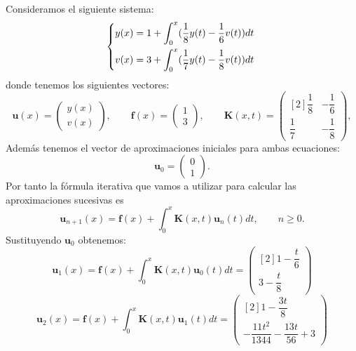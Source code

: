 \begin{ejemplo}
	Consideramos el siguiente sistema:
	\[ \begin{dcases}
		y(x) = 1 + \displaystyle \int_0^x (\dfrac{1}{8}y(t)-\dfrac{1}{6}v(t))dt \\
		v(x) = 3+ \displaystyle \int_0^x (\dfrac{1}{7}y(t)-\dfrac{1}{8}v(t))dt \;
	\end{dcases} \]%
	donde tenemos los siguientes vectores:
	\begin{equation}
		\textbf{u}(x) = \begin{pmatrix}	y(x) \\ v(x)	\end{pmatrix}, \qquad \textbf{f}(x) = \begin{pmatrix}	1 \\ 3	\end{pmatrix}, \qquad \textbf{K}(x,t) = \begin{pmatrix}[2]	\dfrac{1}{8} & -\dfrac{1}{6} \\ \dfrac{ 1}{7} & -\dfrac{1}{8}	\end{pmatrix},
	\end{equation}
	Además tenemos el vector de aproximaciones iniciales para ambas ecuaciones:
	\begin{equation}
		\textbf{u}_0 = \begin{pmatrix}	0 \\ 1	\end{pmatrix}.
	\end{equation}
	Por tanto la fórmula iterativa que vamos a utilizar para calcular las aproximaciones sucesivas es
	\begin{equation}
		\textbf{u}_{n+1}(x) = \textbf{f}(x) + \int_0^x \textbf{K}(x,t)\textbf{u}_n(t)dt, \qquad n \geqslant 0.
	\end{equation}
	Sustituyendo $\textbf{u}_0$ obtenemos:
	\begin{equation}
		\textbf{u}_{1}(x) = \textbf{f}(x) + \int_0^x \textbf{K}(x,t)\textbf{u}_0(t)dt = \begin{pmatrix}[2]	1-\dfrac{t}{6} \\ 3-\dfrac{t}{8}	\end{pmatrix}
	\end{equation}
	\begin{equation}
		\textbf{u}_{2}(x) = \textbf{f}(x) + \int_0^x \textbf{K}(x,t)\textbf{u}_1(t)dt = \begin{pmatrix}[2]	1-\dfrac{3t}{8} \\ -\dfrac{11t^2}{1344}-\dfrac{13t}{56}+3	\end{pmatrix}

\end{equation}
\end{ejemplo}
